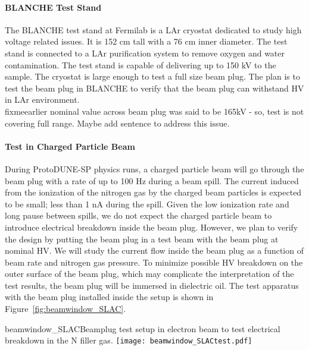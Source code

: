\paragraph{BLANCHE Test Stand}
The BLANCHE test stand at Fermilab is a LAr cryostat dedicated to study high voltage related issues. It is 152 cm tall with a 76 cm inner diameter. The test stand is connected to a LAr purification system to remove oxygen and water contamination. The test stand is capable of delivering up to 150 kV to the sample. The cryostat is large enough to test a full size beam plug. The plan is to test the beam plug in BLANCHE to verify that the beam plug can withstand HV in LAr environment.
\\fixme{earlier nominal value across beam plug was said to be 165kV - so, test is not covering full range. Maybe add sentence to address this issue.}

\paragraph{Test in Charged Particle Beam}
During ProtoDUNE-SP physics runs, a charged particle beam will go through the beam plug with a rate of up to 100 Hz during a beam spill. The current induced from the ionization of the nitrogen gas by the charged beam particles is expected to be small; less than 1 nA during the spill. Given the low ionization rate and long pause between spills, we do not expect the charged particle beam to introduce electrical breakdown inside the beam plug. However, we plan to verify the design by putting the beam plug in a test beam with the beam plug at nominal HV. We will study the current flow inside the beam plug as a function of beam rate and nitrogen gas pressure. To minimize possible HV breakdown on the outer surface of the beam plug, which may complicate the interpretation of the test results, the beam plug will be immersed in dielectric oil. The test apparatus with the beam plug installed inside the setup is shown in Figure~\ref{fig:beamwindow_SLAC}.
\begin{cdrfigure}{beamwindow_SLAC}{Beamplug test setup in electron beam to test electrical breakdown in the N filler gas.}
  \texttt{[image: beamwindow\_SLACtest.pdf]}
\end{cdrfigure}


